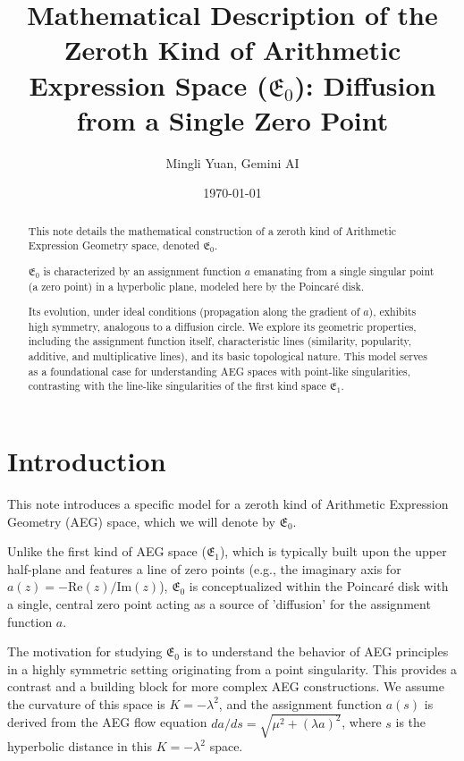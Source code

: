 \documentclass{article}
\title{Mathematical Description of the Zeroth Kind of Arithmetic Expression Space ($\mathfrak{E}_0$): Diffusion from a Single Zero Point}
\author{Mingli Yuan, Gemini AI} %
\date{\today}
\begin{document}
\maketitle

\begin{abstract}
This note details the mathematical construction of a zeroth kind of Arithmetic Expression Geometry space, denoted $\mathfrak{E}_0$.

$\mathfrak{E}_0$ is characterized by an assignment function $a$ emanating from a single singular point (a zero point) in a hyperbolic plane, modeled here by the Poincaré disk.

Its evolution, under ideal conditions (propagation along the gradient of $a$), exhibits high symmetry, analogous to a diffusion circle.
We explore its geometric properties, including the assignment function itself, characteristic lines (similarity, popularity, additive, and multiplicative lines), and its basic topological nature.
This model serves as a foundational case for understanding AEG spaces with point-like singularities, contrasting with the line-like singularities of the first kind space $\mathfrak{E}_1$.
\end{abstract}

\section{Introduction}

This note introduces a specific model for a zeroth kind of Arithmetic Expression Geometry (AEG) space, which we will denote by $\mathfrak{E}_0$.

Unlike the first kind of AEG space ($\mathfrak{E}_1$), which is typically built upon the upper half-plane and features a line of zero points (e.g., the imaginary axis for $a(z) = -\text{Re}(z)/\text{Im}(z)$), $\mathfrak{E}_0$ is conceptualized within the Poincaré disk with a single, central zero point acting as a source of 'diffusion' for the assignment function $a$.


The motivation for studying $\mathfrak{E}_0$ is to understand the behavior of AEG principles in a highly symmetric setting originating from a point singularity. This provides a contrast and a building block for more complex AEG constructions. We assume the curvature of this space is $K = -\lambda^2$, and the assignment function $a(s)$ is derived from the AEG flow equation $da/ds = \sqrt{\mu^2 + (\lambda a)^2}$, where $s$ is the hyperbolic distance in this $K=-\lambda^2$ space.
\end{document}
